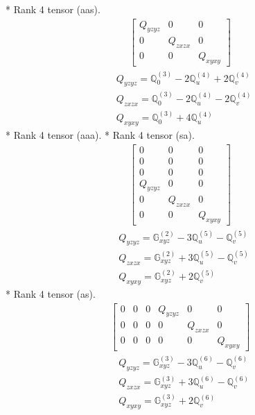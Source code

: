 \documentclass[fleqn,8pt,landscape]{jsarticle}
\begin{document}
* Rank 4 tensor (aas).
\begin{align*}
\begin{bmatrix} Q_{yzyz} & 0 & 0 \\ 0 & Q_{zxzx} & 0 \\ 0 & 0 & Q_{xyxy} \end{bmatrix}
\end{align*}
\begin{align*}
& Q_{yzyz} = \mathbb{Q}_{0}^{(3)} - 2 \mathbb{Q}_{u}^{(4)} + 2 \mathbb{Q}_{v}^{(4)} \\
& Q_{zxzx} = \mathbb{Q}_{0}^{(3)} - 2 \mathbb{Q}_{u}^{(4)} - 2 \mathbb{Q}_{v}^{(4)} \\
& Q_{xyxy} = \mathbb{Q}_{0}^{(3)} + 4 \mathbb{Q}_{u}^{(4)}
\end{align*}
* Rank 4 tensor (aaa).
* Rank 4 tensor (sa).
\begin{align*}
\begin{bmatrix} 0 & 0 & 0 \\ 0 & 0 & 0 \\ 0 & 0 & 0 \\ Q_{yzyz} & 0 & 0 \\ 0 & Q_{zxzx} & 0 \\ 0 & 0 & Q_{xyxy} \end{bmatrix}
\end{align*}
\begin{align*}
& Q_{yzyz} = \mathbb{G}_{xyz}^{(2)} - 3 \mathbb{Q}_{u}^{(5)} - \mathbb{Q}_{v}^{(5)} \\
& Q_{zxzx} = \mathbb{G}_{xyz}^{(2)} + 3 \mathbb{Q}_{u}^{(5)} - \mathbb{Q}_{v}^{(5)} \\
& Q_{xyxy} = \mathbb{G}_{xyz}^{(2)} + 2 \mathbb{Q}_{v}^{(5)}
\end{align*}
* Rank 4 tensor (as).
\begin{align*}
\begin{bmatrix} 0 & 0 & 0 & Q_{yzyz} & 0 & 0 \\ 0 & 0 & 0 & 0 & Q_{zxzx} & 0 \\ 0 & 0 & 0 & 0 & 0 & Q_{xyxy} \end{bmatrix}
\end{align*}
\begin{align*}
& Q_{yzyz} = \mathbb{G}_{xyz}^{(3)} - 3 \mathbb{Q}_{u}^{(6)} - \mathbb{Q}_{v}^{(6)} \\
& Q_{zxzx} = \mathbb{G}_{xyz}^{(3)} + 3 \mathbb{Q}_{u}^{(6)} - \mathbb{Q}_{v}^{(6)} \\
& Q_{xyxy} = \mathbb{G}_{xyz}^{(3)} + 2 \mathbb{Q}_{v}^{(6)}
\end{align*}
\end{document}
